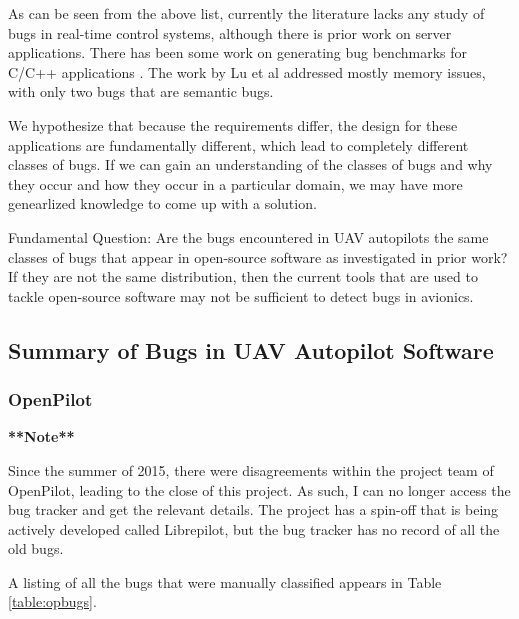 As can be seen from the above list, currently the literature lacks any
study of bugs in real-time control systems, although there is prior
work on server applications. There has been some work on generating
bug benchmarks for C/C++ applications \cite{cifuentes_begbunch_2009}
\cite{lu2005bugbench}. The work by Lu et al \cite{lu2005bugbench}
addressed mostly memory issues, with only two bugs that are semantic
bugs.

We hypothesize that because the requirements differ, the design for these
applications are fundamentally different, which lead to completely
different classes of bugs. If we can gain an understanding of the
classes of bugs and why they occur and how they occur in a particular
domain, we may have more genearlized knowledge to come up with a
solution.

Fundamental Question: Are the bugs encountered in UAV autopilots the
same classes of bugs that appear in open-source software as
investigated in prior work? If they are not the same distribution,
then the current tools that are used to tackle open-source software
may not be sufficient to detect bugs in avionics. 


\subsection{Summary of Bugs in UAV Autopilot Software}

\subsubsection{OpenPilot}

\textbf{**Note**}

Since the summer of 2015, there were disagreements within the project
team of OpenPilot, leading to the close of this project. As such, I
can no longer access the bug tracker and get the relevant details. The
project has a spin-off that is being actively developed called
Librepilot, but the bug tracker has no record of all the old bugs.

A listing of all the bugs that were manually classified appears in
Table \ref{table:opbugs}. 
 
